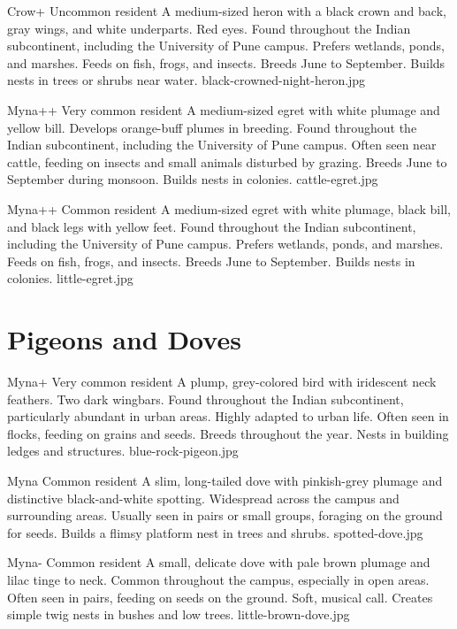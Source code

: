 \documentclass[aspectratio=169]{beamer}
\begin{document}
{Crow+}
{Uncommon resident}
{A medium-sized heron with a black crown and back, gray wings, and white underparts. Red eyes.}
{Found throughout the Indian subcontinent, including the University of Pune campus.}
{Prefers wetlands, ponds, and marshes. Feeds on fish, frogs, and insects.}
{Breeds June to September. Builds nests in trees or shrubs near water.}
{black-crowned-night-heron.jpg}

{Myna++}
{Very common resident}
{A medium-sized egret with white plumage and yellow bill. Develops orange-buff plumes in breeding.}
{Found throughout the Indian subcontinent, including the University of Pune campus.}
{Often seen near cattle, feeding on insects and small animals disturbed by grazing.}
{Breeds June to September during monsoon. Builds nests in colonies.}
{cattle-egret.jpg}

{Myna++}
{Common resident}
{A medium-sized egret with white plumage, black bill, and black legs with yellow feet.}
{Found throughout the Indian subcontinent, including the University of Pune campus.}
{Prefers wetlands, ponds, and marshes. Feeds on fish, frogs, and insects.}
{Breeds June to September. Builds nests in colonies.}
{little-egret.jpg}

\section{Pigeons and Doves}
{Myna+}
{Very common resident}
{A plump, grey-colored bird with iridescent neck feathers. Two dark wingbars.}
{Found throughout the Indian subcontinent, particularly abundant in urban areas.}
{Highly adapted to urban life. Often seen in flocks, feeding on grains and seeds.}
{Breeds throughout the year. Nests in building ledges and structures.}
{blue-rock-pigeon.jpg}

{Myna}
{Common resident}
{A slim, long-tailed dove with pinkish-grey plumage and distinctive black-and-white spotting.}
{Widespread across the campus and surrounding areas.}
{Usually seen in pairs or small groups, foraging on the ground for seeds.}
{Builds a flimsy platform nest in trees and shrubs.}
{spotted-dove.jpg}

{Myna-}
{Common resident}
{A small, delicate dove with pale brown plumage and lilac tinge to neck.}
{Common throughout the campus, especially in open areas.}
{Often seen in pairs, feeding on seeds on the ground. Soft, musical call.}
{Creates simple twig nests in bushes and low trees.}
{little-brown-dove.jpg}
\end{document}
